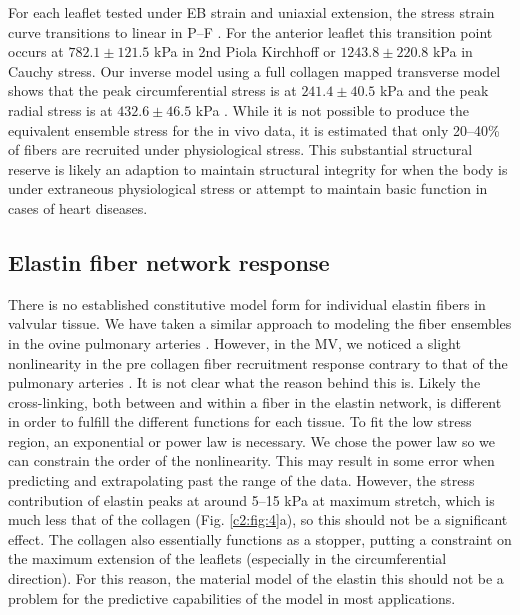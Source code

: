     For each leaflet tested under EB strain and uniaxial extension, the stress strain curve transitions to linear in P–F \cite{sasaki_elongation_1996,sasaki_stress_1996,liao_relation_2007}. For the anterior leaflet this transition point occurs at $782.1\pm121.5$ kPa in 2nd Piola Kirchhoff or $1243.8\pm220.8$ kPa in Cauchy stress. Our inverse model using a full collagen mapped transverse model shows that the peak circumferential stress is at $241.4\pm40.5$ kPa and the peak radial stress is at $432.6\pm46.5$ kPa \cite{lee_inverse_2014}. While it is not possible to produce the equivalent ensemble stress for the in vivo data, it is estimated that only 20–40\% of fibers are recruited under physiological stress. This substantial structural reserve is likely an adaption to maintain structural integrity for when the body is under extraneous physiological stress or attempt to maintain basic function in cases of heart diseases.
    



\subsection{Elastin fiber network response}

    There is no established constitutive model form for individual elastin fibers in valvular tissue. We have taken a similar approach to modeling the fiber ensembles in the ovine pulmonary arteries \cite{fata_insights_2014}. However, in the MV, we noticed a slight nonlinearity in the pre collagen fiber recruitment response contrary to that of the pulmonary arteries \cite{fata_insights_2014}. It is not clear what the reason behind this is. Likely the cross-linking, both between and within a fiber in the elastin network, is different in order to fulfill the different functions for each tissue. To fit the low stress region, an exponential or power law is necessary. We chose the power law so we can constrain the order of the nonlinearity. This may result in some error when predicting and extrapolating past the range of the data. However, the stress contribution of elastin peaks at around 5–15 kPa at maximum stretch, which is much less that of the collagen (Fig. \ref{c2:fig:4}a), so this should not be a significant effect. The collagen also essentially functions as a stopper, putting a constraint on the maximum extension of the leaflets (especially in the circumferential direction). For this reason, the material model of the elastin this should not be a problem for the predictive capabilities of the model in most applications.


